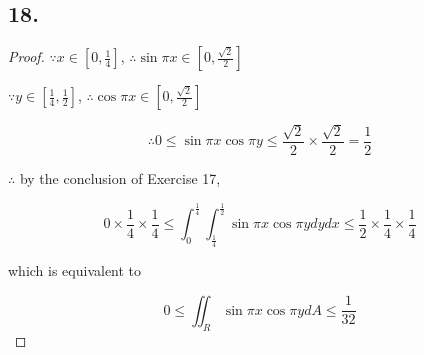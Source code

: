 \documentclass{article}
\begin{document}
  \subsection*{18. }
  \begin{proof}
    $\because x \in [0, \frac 1 4]$, $\therefore \sin \pi x \in [0, \frac{\sqrt 2}{2}]$

    $\because y \in [\frac 1 4, \frac 1 2]$, $\therefore \cos \pi x \in [0, \frac{\sqrt 2}{2}]$

    $$\therefore 0 \leq \sin \pi x \cos \pi y \leq \frac{\sqrt 2}{2} \times \frac{\sqrt 2}{2} = \frac 1 2$$

    $\therefore $ by the conclusion of Exercise 17,

    $$0 \times \frac 1 4 \times \frac 1 4 \leq \int_0^{\frac 1 4}\int_{\frac 1 4}^{\frac 1 2}\sin \pi x \cos \pi y dy dx \leq \frac 1 2 \times \frac 1 4 \times \frac 1 4$$

    which is equivalent to

    $$0 \leq \iint_R \sin \pi x \cos \pi y dA \leq \frac{1}{32}$$
  \end{proof}
\end{document}
